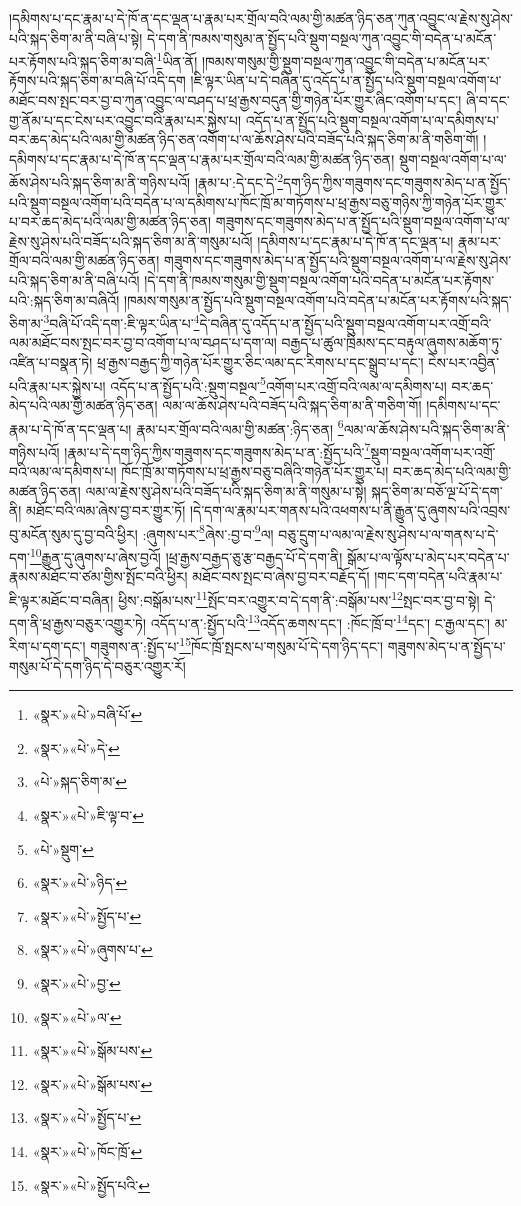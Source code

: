 །དམིགས་པ་དང་རྣམ་པ་དེ་ཁོ་ན་དང་ལྡན་པ་རྣམ་པར་གྲོལ་བའི་ལམ་གྱི་མཚན་ཉིད་ཅན་ཀུན་འབྱུང་ལ་རྗེས་སུ་ཤེས་པའི་སྐད་ཅིག་མ་ནི་བཞི་པ་སྟེ། དེ་དག་ནི་ཁམས་གསུམ་ན་སྤྱོད་པའི་སྡུག་བསྔལ་ཀུན་འབྱུང་གི་བདེན་པ་མངོན་པར་རྟོགས་པའི་སྐད་ཅིག་མ་བཞི་\footnote{«སྣར་»«པེ་»བཞི་པོ་}ཡིན་ནོ། །ཁམས་གསུམ་གྱི་སྡུག་བསྔལ་ཀུན་འབྱུང་གི་བདེན་པ་མངོན་པར་རྟོགས་པའི་སྐད་ཅིག་མ་བཞི་པོ་འདི་དག །ཇི་ལྟར་ཡིན་པ་དེ་བཞིན་དུ་འདོད་པ་ན་སྤྱོད་པའི་སྡུག་བསྔལ་འགོག་པ་མཐོང་བས་སྤང་བར་བྱ་བ་ཀུན་འབྱུང་ལ་བཤད་པ་ཕྲ་རྒྱས་བདུན་གྱི་གཉེན་པོར་གྱུར་ཞིང་འགོག་པ་དང་། ཞི་བ་དང་གྱ་ནོམ་པ་དང་ངེས་པར་འབྱུང་བའི་རྣམ་པར་སྐྱེས་པ། འདོད་པ་ན་སྤྱོད་པའི་སྡུག་བསྔལ་འགོག་པ་ལ་དམིགས་པ་བར་ཆད་མེད་པའི་ལམ་གྱི་མཚན་ཉིད་ཅན་འགོག་པ་ལ་ཆོས་ཤེས་པའི་བཟོད་པའི་སྐད་ཅིག་མ་ནི་གཅིག་གོ། །དམིགས་པ་དང་རྣམ་པ་དེ་ཁོ་ན་དང་ལྡན་པ་རྣམ་པར་གྲོལ་བའི་ལམ་གྱི་མཚན་ཉིད་ཅན། སྡུག་བསྔལ་འགོག་པ་ལ་ཆོས་ཤེས་པའི་སྐད་ཅིག་མ་ནི་གཉིས་པའོ། །རྣམ་པ་:དེ་དང་དེ་\footnote{«སྣར་»«པེ་»དེ་}དག་ཉིད་ཀྱིས་གཟུགས་དང་གཟུགས་མེད་པ་ན་སྤྱོད་པའི་སྡུག་བསྔལ་འགོག་པའི་བདེན་པ་ལ་དམིགས་པ་ཁོང་ཁྲོ་མ་གཏོགས་པ་ཕྲ་རྒྱས་བཅུ་གཉིས་ཀྱི་གཉེན་པོར་གྱུར་པ་བར་ཆད་མེད་པའི་ལམ་གྱི་མཚན་ཉིད་ཅན། གཟུགས་དང་གཟུགས་མེད་པ་ན་སྤྱོད་པའི་སྡུག་བསྔལ་འགོག་པ་ལ་རྗེས་སུ་ཤེས་པའི་བཟོད་པའི་སྐད་ཅིག་མ་ནི་གསུམ་པའོ། །དམིགས་པ་དང་རྣམ་པ་དེ་ཁོ་ན་དང་ལྡན་པ། རྣམ་པར་གྲོལ་བའི་ལམ་གྱི་མཚན་ཉིད་ཅན། གཟུགས་དང་གཟུགས་མེད་པ་ན་སྤྱོད་པའི་སྡུག་བསྔལ་འགོག་པ་ལ་རྗེས་སུ་ཤེས་པའི་སྐད་ཅིག་མ་ནི་བཞི་པའོ། །དེ་དག་ནི་ཁམས་གསུམ་གྱི་སྡུག་བསྔལ་འགོག་པའི་བདེན་པ་མངོན་པར་རྟོགས་པའི་:སྐད་ཅིག་མ་བཞིའོ། །ཁམས་གསུམ་ན་སྤྱོད་པའི་སྡུག་བསྔལ་འགོག་པའི་བདེན་པ་མངོན་པར་རྟོགས་པའི་སྐད་ཅིག་མ་\footnote{«པེ་»སྐད་ཅིག་མ་}བཞི་པོ་འདི་དག་:ཇི་ལྟར་ཡིན་པ་\footnote{«སྣར་»«པེ་»ཇི་ལྟ་བ་}དེ་བཞིན་དུ་འདོད་པ་ན་སྤྱོད་པའི་སྡུག་བསྔལ་འགོག་པར་འགྲོ་བའི་ལམ་མཐོང་བས་སྤང་བར་བྱ་བ་འགོག་པ་ལ་བཤད་པ་དག་ལ། བརྒྱད་པ་ཚུལ་ཁྲིམས་དང་བརྟུལ་ཞུགས་མཆོག་ཏུ་འཛིན་པ་བསྣན་ཏེ། ཕྲ་རྒྱས་བརྒྱད་ཀྱི་གཉེན་པོར་གྱུར་ཅིང་ལམ་དང་རིགས་པ་དང་སྒྲུབ་པ་དང་། ངེས་པར་འབྱིན་པའི་རྣམ་པར་སྐྱེས་པ། འདོད་པ་ན་སྤྱོད་པའི་:སྡུག་བསྔལ་\footnote{«པེ་»སྡུག་}འགོག་པར་འགྲོ་བའི་ལམ་ལ་དམིགས་པ། བར་ཆད་མེད་པའི་ལམ་གྱི་མཚན་ཉིད་ཅན། ལམ་ལ་ཆོས་ཤེས་པའི་བཟོད་པའི་སྐད་ཅིག་མ་ནི་གཅིག་གོ། །དམིགས་པ་དང་རྣམ་པ་དེ་ཁོ་ན་དང་ལྡན་པ། རྣམ་པར་གྲོལ་བའི་ལམ་གྱི་མཚན་:ཉིད་ཅན། \footnote{«སྣར་»«པེ་»ཉིད་}ལམ་ལ་ཆོས་ཤེས་པའི་སྐད་ཅིག་མ་ནི་གཉིས་པའོ། །རྣམ་པ་དེ་དག་ཉིད་ཀྱིས་གཟུགས་དང་གཟུགས་མེད་པ་ན་:སྤྱོད་པའི་\footnote{«སྣར་»«པེ་»སྤྱོད་པ་}སྡུག་བསྔལ་འགོག་པར་འགྲོ་བའི་ལམ་ལ་དམིགས་པ། ཁོང་ཁྲོ་མ་གཏོགས་པ་ཕྲ་རྒྱས་བཅུ་བཞིའི་གཉེན་པོར་གྱུར་པ། བར་ཆད་མེད་པའི་ལམ་གྱི་མཚན་ཉིད་ཅན། ལམ་ལ་རྗེས་སུ་ཤེས་པའི་བཟོད་པའི་སྐད་ཅིག་མ་ནི་གསུམ་པ་སྟེ། སྐད་ཅིག་མ་བཅོ་ལྔ་པོ་དེ་དག་ནི། མཐོང་བའི་ལམ་ཞེས་བྱ་བར་གྱུར་ཏོ། །དེ་དག་ལ་རྣམ་པར་གནས་པའི་འཕགས་པ་ནི་རྒྱུན་དུ་ཞུགས་པའི་འབྲས་བུ་མངོན་སུམ་དུ་བྱ་བའི་ཕྱིར། :ཞུགས་པར་\footnote{«སྣར་»«པེ་»ཞུགས་པ་}ཞེས་:བྱ་བ་\footnote{«སྣར་»«པེ་»བྱ་}ལ། བཅུ་དྲུག་པ་ལམ་ལ་རྗེས་སུ་ཤེས་པ་ལ་གནས་པ་དེ་དག་\footnote{«སྣར་»«པེ་»ལ་}རྒྱུན་དུ་ཞུགས་པ་ཞེས་བྱའོ། །ཕྲ་རྒྱས་བརྒྱད་ཅུ་རྩ་བརྒྱད་པོ་དེ་དག་ནི། སྒོམ་པ་ལ་ལྟོས་པ་མེད་པར་བདེན་པ་རྣམས་མཐོང་བ་ཙམ་གྱིས་སྤོང་བའི་ཕྱིར། མཐོང་བས་སྤང་བ་ཞེས་བྱ་བར་བརྗོད་དོ། །གང་དག་བདེན་པའི་རྣམ་པ་ཇི་ལྟར་མཐོང་བ་བཞིན། ཕྱིས་:བསྒོམ་པས་\footnote{«སྣར་»«པེ་»སྒོམ་པས་}སྤོང་བར་འགྱུར་བ་དེ་དག་ནི་:བསྒོམ་པས་\footnote{«སྣར་»«པེ་»སྒོམ་པས་}སྤང་བར་བྱ་བ་སྟེ། དེ་དག་ནི་ཕྲ་རྒྱས་བཅུར་འགྱུར་ཏེ། འདོད་པ་ན་:སྤྱོད་པའི་\footnote{«སྣར་»«པེ་»སྤྱོད་པ་}འདོད་ཆགས་དང་། :ཁོང་ཁྲོ་བ་\footnote{«སྣར་»«པེ་»ཁོང་ཁྲོ་}དང་། ང་རྒྱལ་དང་། མ་རིག་པ་དག་དང་། གཟུགས་ན་:སྤྱོད་པ་\footnote{«སྣར་»«པེ་»སྤྱོད་པའི་}ཁོང་ཁྲོ་སྤངས་པ་གསུམ་པོ་དེ་དག་ཉིད་དང་། གཟུགས་མེད་པ་ན་སྤྱོད་པ་གསུམ་པོ་དེ་དག་ཉིད་དེ་བཅུར་འགྱུར་རོ། 